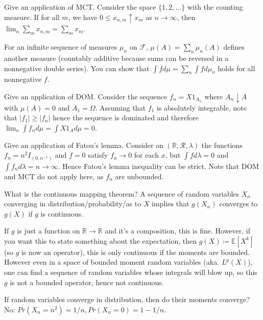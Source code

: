 \documentclass[avery5388,grid,frame]{flashcards}
\newcommand{\R}{\mathbb{R}}
\newcommand{\E}{\mathbb{E}}
\newcommand{\F}{\mathcal F}
\begin{document}
\begin{flashcard}
    {Give an application of MCT.}
    Consider the space $\{ 1, 2, \dots \}$ with the counting measure. If for all $m$, we have $0 \leq x_{n,m} \uparrow x_m$ as $n \rightarrow \infty$, then $\lim_n \sum_m x_{n,m} = \sum_m x_m$.

    For an infinite sequence of measures $\mu_n$ on $\F$, $\mu(A) = \sum_n \mu_n(A)$ defines another measure (countably additive because sums can be reversed in a nonnegative double series). You can show that $\int f d\mu = \sum_n \int f d\mu_n$ holds for all nonnegative $f$.
\end{flashcard}


\begin{flashcard}
    {Give an application of DOM.}
    Consider the sequence $f_n = X 1_{A_n} $ where $A_n \downarrow A$ with $\mu(A) = 0$ and $A_1 = \Omega$. Assuming that $f_1$ is absolutely integrable, note that $|f_1| \geq |f_n|$ hence the sequence is dominated and therefore $\lim_n \int f_n d\mu = \int X 1_{A} d\mu = 0$.
\end{flashcard}


\begin{flashcard}
    {Give an application of Fatou's lemma.}
    Consider on $(\R, \mathcal R, \lambda)$ the functions $f_n = n^2 I_{(0,n^{-1})}$ and $f = 0$ satisfy $f_n \rightarrow 0$ for each $x$, but $\int f d\lambda = 0$ and $\int f_n d\lambda = n \rightarrow \infty$. Hence Fatou's lemma inequality can be strict. Note that DOM and MCT do not apply here, as $f_n$ are unbounded.
\end{flashcard}


\begin{flashcard}
    {What is the continuous mapping theorem?}
    A sequence of random variables $X_n$ converging in distribution/probability/as to $X$ implies that $g(X_n)$ converges to $g(X)$ if $g$ is continuous.

    If $g$ is just a function on $\R \rightarrow \R$ and it's a composition, this is fine. However, if you want this to state something about the expectation, then $g(X) \coloneqq \E[X^k]$ (so $g$ is now an operator), this is only continuous if the moments are bounded. However even in a space of bounded moment random variables (aka. $L^p(X)$), one can find a sequence of random variables whose integrals will blow up, so this $g$ is not a bounded operator, hence not continuous.

    If random variables converge in distribution, then do their moments converge? No:
    $Pr(X_n = n^2) = 1/n, Pr(X_n = 0) = 1 - 1/n.$
\end{flashcard}
\end{document}
